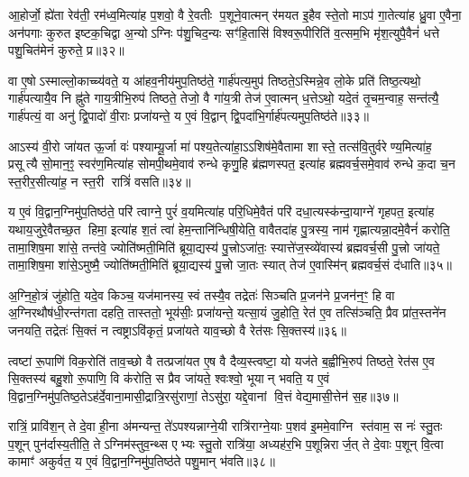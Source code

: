 आ॒होर्जो॒ ह्ये॑ता रेव॑ती॒ रम॑ध्व॒मित्या॑ह प॒शवो॒ वै रे॒वतीः प॒शूने॒वात्मन् र॑मयत इ॒हैव स्ते॒तो माऽप॑ गा॒तेत्या॑ह ध्रु॒वा ए॒वैना॒ अन॑पगाः कुरुत इष्टक॒चिद्वा अ॒न्योऽग्निः प॑शु॒चिद॒न्यः सꣳ॑हि॒तासि॑ विश्वरू॒पीरिति॑ व॒त्सम॒भि मृ॑श॒त्युपै॒वैनं॑ धत्ते पशु॒चित॑मेनं कुरुते॒ प्र॥३२॥

वा ए॒षोऽस्माल्लो॒काच्च्य॑वते॒ य आ॑हव॒नीय॑मुप॒तिष्ठ॑ते॒ गार्\mbox{}ह॑पत्य॒मुप॑ तिष्ठते॒ऽस्मिन्ने॒व लो॒के प्रति॑ तिष्ठ॒त्यथो॒ गार्\mbox{}ह॑पत्यायै॒व नि ह्नु॑ते गाय॒त्रीभि॒रुप॑ तिष्ठते॒ तेजो॒ वै गा॑य॒त्री तेज॑ ए॒वात्मन् ध॒त्तेऽथो॒ यदे॒तं तृ॒चम॒न्वाह॒ सन्त॑त्यै॒ गार्\mbox{}ह॑पत्यं॒ वा अनु॑ द्वि॒पादो॑ वी॒राः प्रजा॑यन्ते॒ य ए॒वं वि॒द्वान् द्वि॒पदा॑भि॒र्गार्\mbox{}ह॑पत्यमुप॒तिष्ठ॑ते॥३३॥

आऽस्य॑ वी॒रो जा॑यत ऊ॒र्जा वः॑ पश्याम्यू॒र्जा मा॑ पश्य॒तेत्या॑हा॒ऽऽशिष॑मे॒वैतामा शास्ते॒ तत्स॑वि॒तुर्वरेण्य॒मित्या॑ह॒ प्रसूत्यै सो॒मान॒ꣵ॒ स्वर॑ण॒मित्या॑ह सोमपी॒थमे॒वाव॑ रुन्धे कृणु॒हि ब्र॑ह्मणस्पत॒ इत्या॑ह ब्रह्मवर्च॒समे॒वाव॑ रुन्धे क॒दा च॒न स्त॒रीर॒सीत्या॑ह॒ न स्त॒री रात्रिं॑ वसति॥३४॥

य ए॒वं वि॒द्वान॒ग्निमु॑प॒तिष्ठ॑ते॒ परि॑ त्वाग्ने॒ पुरं॑ व॒यमित्या॑ह परि॒धिमे॒वैतं परि॑ दधा॒त्यस्क॑न्दा॒याग्ने॑ गृहपत॒ इत्या॑ह यथाय॒जुरे॒वैतच्छ॒त हिमा॒ इत्या॑ह श॒तं त्वा॑ हेम॒न्तानि॑न्धिषी॒येति॒ वावैतदा॑ह पु॒त्रस्य॒ नाम॑ गृह्णात्यन्ना॒दमे॒वैनं॑ करोति॒ तामा॒शिष॒मा शा॑से॒ तन्त॑वे॒ ज्योति॑ष्मती॒मिति॑ ब्रूया॒द्यस्य॑ पु॒त्त्रोऽजा॑तः॒ स्यात्ते॑ज॒स्व्ये॑वास्य॑ ब्रह्मवर्च॒सी पु॒त्त्रो जा॑यते॒ तामा॒शिष॒मा शा॑से॒ऽमुष्मै॒ ज्योति॑ष्मती॒मिति॑ ब्रूया॒द्यस्य॑ पु॒त्त्रो जा॒तः स्यात् तेज॑ ए॒वास्मि॑न् ब्रह्मवर्च॒सं द॑धाति॥३५॥

{}

अ॒ग्नि॒हो॒त्रं जु॑होति॒ यदे॒व किञ्च॒ यज॑मानस्य॒ स्वं तस्यै॒व तद्रेतः॑ सिञ्चति प्र॒जन॑ने प्र॒जन॑न॒ꣳ॒ हि वा अ॒ग्निरथौष॑धी॒रन्त॑गता दहति॒ तास्ततो॒ भूय॑सीः॒ प्रजा॑यन्ते॒ यत्सा॒यं जु॒होति॒ रेत॑ ए॒व तत्सि॑ञ्चति॒ प्रैव प्रा॑त॒स्तने॑न जनयति॒ तद्रेतः॑ सि॒क्तं न त्वष्ट्राऽवि॑कृतं॒ प्रजा॑यते याव॒च्छो वै रेत॑सः सि॒क्तस्य॑॥३६॥

त्वष्टा॑ रू॒पाणि॑ विक॒रोति॑ ताव॒च्छो वै तत्प्रजा॑यत ए॒ष वै दैव्य॒स्त्वष्टा॒ यो यज॑ते ब॒ह्वीभि॒रुप॑ तिष्ठते॒ रेत॑स ए॒व सि॒क्तस्य॑ बहु॒शो रू॒पाणि॒ वि क॑रोति॒ स प्रैव जा॑यते॒ श्वःश्वो॒ भूयान् भवति॒ य ए॒वं वि॒द्वान॒ग्निमु॑प॒तिष्ठ॒तेऽह॑र्दे॒वाना॒मासी॒द्रात्रि॒रसु॑राणां॒ तेऽसु॑रा॒ यद्दे॒वानां वि॒त्तं वेद्य॒मासी॒त्तेन॑ स॒ह॥३७॥

रात्रिं॒ प्रावि॑श॒न् ते दे॒वा ही॒ना अ॑मन्यन्त॒ ते॑ऽपश्यन्नाग्ने॒यी रात्रि॑राग्ने॒याः प॒शव॑ इ॒ममे॒वाग्नि स्त॑वाम॒ स नः॑ स्तु॒तः प॒शून् पुन॑र्दास्य॒तीति॒ तेऽग्निम॑स्तुव॒न्थ्स एभ्यः स्तु॒तो रात्रि॑या॒ अध्यह॑र॒भि प॒शून्निरार्ज॒त् ते दे॒वाः प॒शून् वि॒त्वा कामाꣳ॑ अकुर्वत॒ य ए॒वं वि॒द्वान॒ग्निमु॑प॒तिष्ठ॑ते पशु॒मान् भ॑वति॥३८॥

